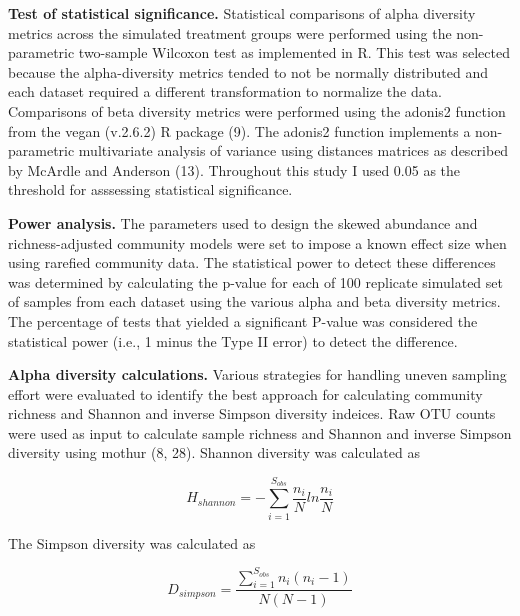 \documentclass[
]{article}
\begin{document}
\textbf{Test of statistical significance.} Statistical comparisons of
alpha diversity metrics across the simulated treatment groups were
performed using the non-parametric two-sample Wilcoxon test as
implemented in R. This test was selected because the alpha-diversity
metrics tended to not be normally distributed and each dataset required
a different transformation to normalize the data. Comparisons of beta
diversity metrics were performed using the adonis2 function from the
vegan (v.2.6.2) R package (9). The adonis2 function implements a
non-parametric multivariate analysis of variance using distances
matrices as described by McArdle and Anderson (13). Throughout this
study I used 0.05 as the threshold for asssessing statistical
significance.

\textbf{Power analysis.} The parameters used to design the skewed
abundance and richness-adjusted community models were set to impose a
known effect size when using rarefied community data. The statistical
power to detect these differences was determined by calculating the
p-value for each of 100 replicate simulated set of samples from each
dataset using the various alpha and beta diversity metrics. The
percentage of tests that yielded a significant P-value was considered
the statistical power (i.e., 1 minus the Type II error) to detect the
difference.

\textbf{Alpha diversity calculations.} Various strategies for handling
uneven sampling effort were evaluated to identify the best approach for
calculating community richness and Shannon and inverse Simpson diversity
indeices. Raw OTU counts were used as input to calculate sample richness
and Shannon and inverse Simpson diversity using mothur (8, 28). Shannon
diversity was calculated as

\[H_{shannon} = - \sum_{i=1}^{S_{obs}} \frac{n_i}{N} ln \frac{n_i}{N}\]

The Simpson diversity was calculated as

\[D_{simpson} = \frac {\sum_{i=1}^{S_{obs}} {n_i \left ( n_i - 1 \right )}}{N \left( N-1 \right )}\]
\end{document}
